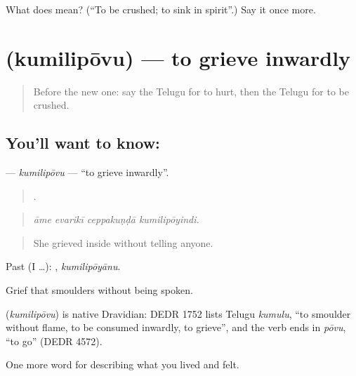 \begin{tcolorbox}[breakable,colback=teal!4,colframe=teal!35!black,title={Before you move on}]
What does  mean? (\textquotedblleft{}To be crushed; to sink in spirit\textquotedblright{}.) Say it once more.
\end{tcolorbox}
\section[\texorpdfstring{\te{కుమిలిపోవు} (kumilipōvu)}{కుమిలిపోవు (kumilipōvu)}]{ (kumilipōvu) — to grieve inwardly}

\label{lesson:TE-C496-kumilipovu}



\begin{quote}
Before the new one: say the Telugu for to hurt, then the Telugu for to be crushed.
\end{quote}

\subsection*{You'll want to know: }
\textbf{} — \emph{kumilipōvu} — \textquotedblleft{}to grieve inwardly\textquotedblright{}.

\begin{quote}
   .
\end{quote}

\begin{quote}
\emph{āme evarikī ceppakuṇḍā kumilipōyindi.}
\end{quote}

\begin{quote}
She grieved inside without telling anyone.
\end{quote}

Past (I …): , \emph{kumilipōyānu}.

Grief that smoulders without being spoken.

\begin{cousinweb}
\textbf{} (\emph{kumilipōvu}) is native Dravidian: DEDR 1752 lists Telugu \emph{kumulu}, \textquotedblleft{}to smoulder without flame, to be consumed inwardly, to grieve\textquotedblright{}, and the verb ends in \emph{pōvu}, \textquotedblleft{}to go\textquotedblright{} (DEDR 4572).
\end{cousinweb}

\begin{grammarlens}[title={What you've built}]
One more word for describing what you lived and felt.
\end{grammarlens}

